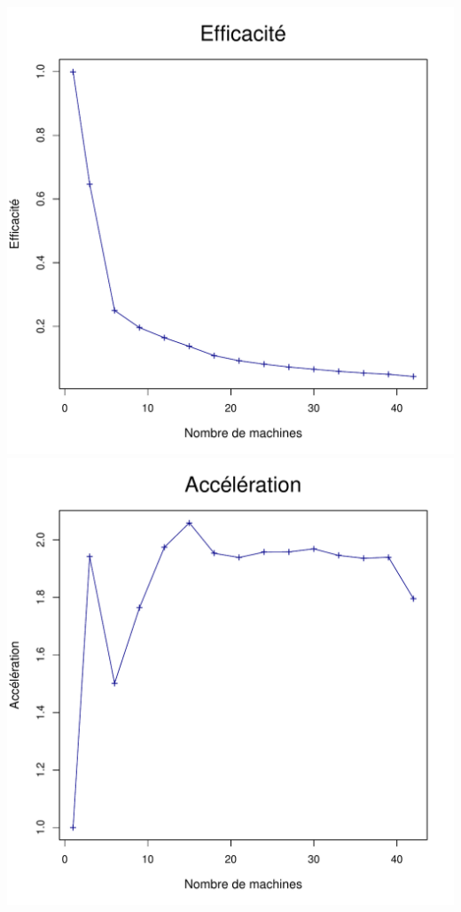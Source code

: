 \documentclass[a4paper, 11pt, titlepage]{article}
\begin{document}
\begin{center}
    \includegraphics[scale=0.45]{res/sujet_makefiles_blender_249_Makefile_nth8_eff.pdf}
    \includegraphics[scale=0.45]{res/sujet_makefiles_blender_249_Makefile_nth8_acc.pdf}

\end{center}
\end{document}
